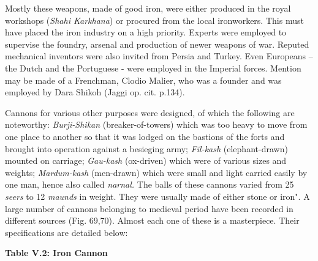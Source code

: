 Mostly these weapons, made of good iron, were either produced in the royal workshops (\textit{Shahi Karkhana}) or procured from the local ironworkers. This must have placed the iron industry on a high priority. Experts were employed to supervise the foundry, arsenal and production of newer weapons of war. Reputed mechanical inventors were also invited from Persia and Turkey. Even Europeans – the Dutch and the Portuguese - were employed in the Imperial forces. Mention may be made of a Frenchman, Clodio Malier, who was a founder and was employed by Dara Shikoh (Jaggi op. cit. p.134).

Cannons for various other purposes were designed, of which the following are noteworthy: \textit{Burji-Shikan }(breaker-of-towers) which was too heavy to move from one place to another so that it was lodged on the bastions of the forts and brought into operation against a besieging army; \textit{Fil-kash }(elephant-drawn) mounted on carriage; \textit{Gau-kash }(ox-driven) which were of various sizes and weights; \textit{Mardum-kash }(men-drawn) which were small and light carried easily by one man, hence also called \textit{narnal. }The balls of these cannons varied from 25 \textit{seers }to 12 \textit{maunds }in weight. They were usually made of either stone or iron". A large number of cannons belonging to medieval period have been recorded in different sources (Fig. 69,70). Almost each one of these is a masterpiece. Their specifications are detailed below:

\begin{center}
\textbf{Table V.2: Iron Cannon}
\end{center}


